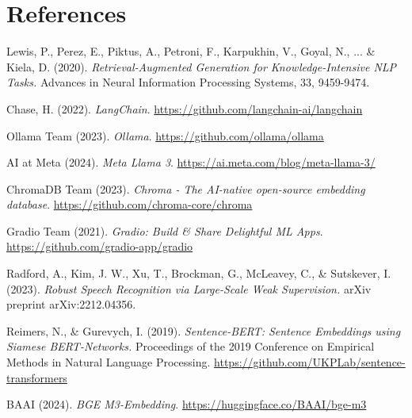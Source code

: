 \chapter*{References}

\begin{thebibliography}{99}

Lewis, P., Perez, E., Piktus, A., Petroni, F., Karpukhin, V., Goyal, N., ... \& Kiela, D. (2020).
\textit{Retrieval-Augmented Generation for Knowledge-Intensive NLP Tasks.}
Advances in Neural Information Processing Systems, 33, 9459-9474.

Chase, H. (2022).
\textit{LangChain}.
\url{https://github.com/langchain-ai/langchain}

Ollama Team (2023).
\textit{Ollama}.
\url{https://github.com/ollama/ollama}

AI at Meta (2024).
\textit{Meta Llama 3}.
\url{https://ai.meta.com/blog/meta-llama-3/}

ChromaDB Team (2023).
\textit{Chroma - The AI-native open-source embedding database}.
\url{https://github.com/chroma-core/chroma}

Gradio Team (2021).
\textit{Gradio: Build \& Share Delightful ML Apps}.
\url{https://github.com/gradio-app/gradio}

Radford, A., Kim, J. W., Xu, T., Brockman, G., McLeavey, C., \& Sutskever, I. (2023).
\textit{Robust Speech Recognition via Large-Scale Weak Supervision.}
arXiv preprint arXiv:2212.04356.

Reimers, N., \& Gurevych, I. (2019).
\textit{Sentence-BERT: Sentence Embeddings using Siamese BERT-Networks.}
Proceedings of the 2019 Conference on Empirical Methods in Natural Language Processing.
\url{https://github.com/UKPLab/sentence-transformers}

BAAI (2024).
\textit{BGE M3-Embedding}.
\url{https://huggingface.co/BAAI/bge-m3}

\end{thebibliography} 